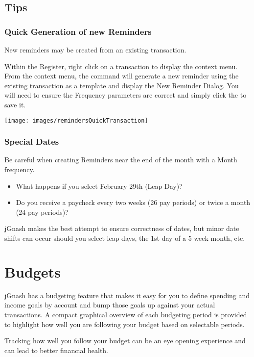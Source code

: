 \documentclass[letterpaper,12pt]{book}
\begin{document}
    \section{Tips}

    \subsection{Quick Generation of new Reminders}
    New reminders may be created from an existing transaction.

    Within the Register, right click on a transaction to display the context menu.
    From the context menu, the  command will generate a new reminder using the existing
    transaction as a template and display the New Reminder Dialog.
    You will need to ensure the Frequency parameters are correct and simply click the to save it.

    \texttt{[image: images/remindersQuickTransaction]}

    \subsection{Special Dates}
    Be careful when creating Reminders near the end of the month with a Month frequency.

    \begin{itemize}
        \item What happens if you select February 29th (Leap Day)?
        \item Do you receive a paycheck every two weeks (26 pay periods) or twice a month (24 pay periods)?
    \end{itemize}

    jGnash makes the best attempt to ensure correctness of dates, but minor date shifts can occur should you select leap days,
    the 1st day of a 5 week month, etc.

    \chapter{Budgets}

    jGnash has a budgeting feature that makes it easy for you to define spending and income goals by account and bump those goals up against your actual transactions.
    A compact graphical overview of each budgeting period is provided to highlight how well you are following your budget based on selectable periods.

    Tracking how well you follow your budget can be an eye opening experience and can lead to better financial health.
\end{document}
